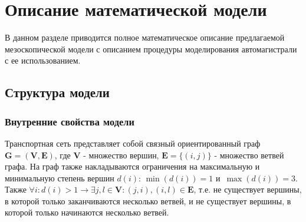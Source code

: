 \chapter{Описание математической модели}\label{ch:ch3}

В данном разделе приводится полное математическое описание предлагаемой мезоскопической модели с описанием процедуры моделирования автомагистрали с ее использованием.
\section{Структура модели}
\label{sec:model}
\subsection{Внутренние свойства модели}
\label{sec:graph_structure}
Транспортная сеть представляет собой связный ориентированный граф \(\mathbf{G} = (\mathbf{V}, \mathbf{E})\),
где \(\mathbf{V}\) - множество вершин, \(\mathbf{E} = \{(i, j)\}\) - множество ветвей графа.
На граф также накладываются ограничения на максимальную и минимальную степень вершин \(d(i)\): \(\min(d(i)) = 1\) и~\(\max(d(i)) = 3\).
Также \(\forall i: d(i) > 1 \rightarrow \exists j, l \in \mathbf{V} : (j, i), (i, l) \in \mathbf{E}\), т.е. не существует вершины, в которой только заканчиваются несколько ветвей, и не существует вершины, в которой только начинаются несколько ветвей.

